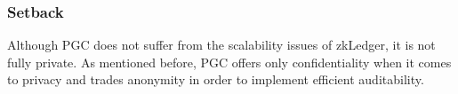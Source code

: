
\subsubsection{Setback}
Although PGC does not suffer from the scalability issues of zkLedger, it is not fully private. As mentioned before, PGC offers only confidentiality when it comes to privacy and trades anonymity in order to implement efficient auditability.